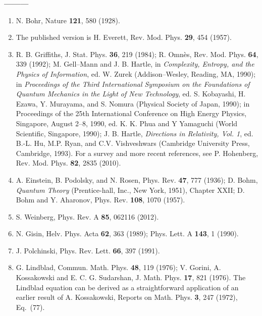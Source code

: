 \documentclass[12pt]{article}
\begin{document}
\vspace{20pt}



\begin{center}
{\bf ---------}
\end{center}

\vspace{10pt}

\begin{enumerate}

\item N. Bohr, Nature {\bf 121}, 580 (1928).
\item The published version is H. Everett, Rev. Mod. Phys. {\bf 29}, 454 (1957).
 \item R. B. Griffiths, J. Stat. Phys. {\bf 36}, 219 (1984); R. Omn\`{e}s, Rev. Mod. Phys. {\bf 64}, 339 (1992); M. Gell--Mann and J. B. Hartle, in {\em Complexity, Entropy, and the Physics of Information}, ed. W. Zurek (Addison--Wesley, Reading, MA, 1990); in {\em Proceedings of the Third International Symposium on the Foundations of Quantum Mechanics in the Light of New Technology}, ed. S. Kobayashi, H. Ezawa, Y. Murayama, and S. Nomura (Physical Society of Japan, 1990); in {Proceedings of the 25th International Conference on High Energy Physics, Singapore, August 2--8, 1990}, ed. K. K. Phua and Y Yamaguchi (World Scientific, Singapore, 1990); J. B. Hartle, {\em Directions in Relativity, Vol. 1}, ed. B.-L. Hu, M.P. Ryan, and C.V. Vishveshwars (Cambridge University Press, Cambridge, 1993).  For a survey and more recent references, see P. Hohenberg, Rev. Mod. Phys. {\bf 82}, 2835 (2010).
  \item A. Einstein, B. Podolsky, and N. Rosen, Phys. Rev. {\bf 47}, 777 (1936); D. Bohm, {\em Quantum Theory} (Prentice-hall, Inc., New York, 1951), Chapter XXII; D. Bohm and Y. Aharonov, Phys. Rev. {\bf 108}, 1070 (1957).            
 \item  S. Weinberg, Phys. Rev. A {\bf 85}, 062116 (2012). 
\item N. Gisin, Helv. Phys. Acta {\bf 62}, 363 (1989); Phys. Lett. A {\bf 143}, 1 (1990).  
\item  J. Polchinski, Phys. Rev. Lett. {\bf 66}, 397 (1991).
\item G. Lindblad, Commun. Math. Phys. {\bf 48}, 119 (1976); V. Gorini, A. Kossakowski and E. C. G. Sudarshan, J. Math. Phys. {\bf 17}, 821 (1976).  The Lindblad equation can be derived as a straightforward application of an earlier result of A. Kossakowski, Reports on Math.  Phys. {\bf 3}, 247 (1972), Eq.~(77).

\end{enumerate}
\end{document}
